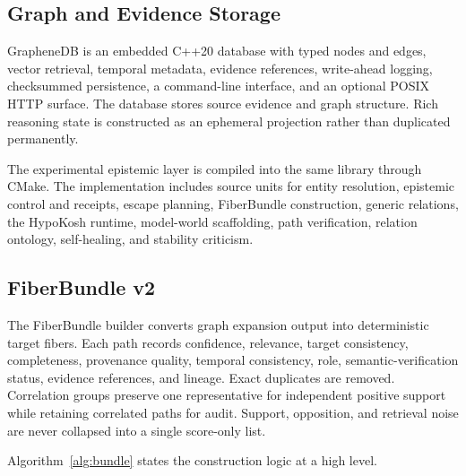 \documentclass[10pt]{article}
\begin{document}
\subsection{Graph and Evidence Storage}
GrapheneDB is an embedded C++20 database with typed nodes and edges, vector retrieval, temporal metadata, evidence references, write-ahead logging, checksummed persistence, a command-line interface, and an optional POSIX HTTP surface. The database stores source evidence and graph structure. Rich reasoning state is constructed as an ephemeral projection rather than duplicated permanently.

The experimental epistemic layer is compiled into the same library through CMake. The implementation includes source units for entity resolution, epistemic control and receipts, escape planning, FiberBundle construction, generic relations, the HypoKosh runtime, model-world scaffolding, path verification, relation ontology, self-healing, and stability criticism.

\subsection{FiberBundle v2}
The FiberBundle builder converts graph expansion output into deterministic target fibers. Each path records confidence, relevance, target consistency, completeness, provenance quality, temporal consistency, role, semantic-verification status, evidence references, and lineage. Exact duplicates are removed. Correlation groups preserve one representative for independent positive support while retaining correlated paths for audit. Support, opposition, and retrieval noise are never collapsed into a single score-only list.

Algorithm~\ref{alg:bundle} states the construction logic at a high level.
\end{document}
